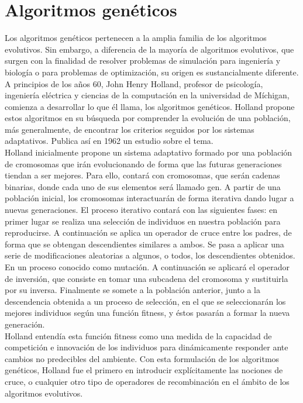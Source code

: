 \documentclass[12pt]{article} \usepackage[utf8x]{inputenc}
\begin{document}
\section{Algoritmos genéticos}

Los algoritmos genéticos pertenecen a la amplia familia de los algoritmos evolutivos. 
Sin embargo, a diferencia de la mayoría de algoritmos evolutivos, que surgen 
con la finalidad de resolver problemas de simulación para ingeniería y biología o para
problemas de optimización, su origen es sustancialmente diferente. A principios de 
los años 60, John Henry Holland, profesor de psicología, ingeniería eléctrica y ciencias
de la computación en la universidad de Míchigan, comienza a desarrollar lo que él llama,
los algoritmos genéticos. Holland propone estos algoritmos en su búsqueda por comprender
la evolución de una población, más generalmente, de encontrar los criterios seguidos
por los sistemas adaptativos. Publica así en 1962 un estudio sobre el tema.\\ 



Holland inicialmente propone un sistema adaptativo formado por una población 
de cromosomas que irán evolucionando de forma que las futuras generaciones 
tiendan a ser mejores. Para ello, contará con cromosomas, que serán cadenas 
binarias, donde cada uno de sus elementos será llamado gen. A partir de una 
población inicial, los cromosomas interactuarán de forma iterativa dando lugar 
a nuevas generaciones. El proceso iterativo contará con las siguientes fases: 
en primer lugar se realiza una selección de individuos en nuestra población 
para reproducirse. A continuación se aplica un operador de cruce entre los 
padres, de forma que se obtengan descendientes similares a ambos. Se pasa a 
aplicar una serie de modificaciones aleatorias a algunos, o todos, los descendientes 
obtenidos. En un proceso conocido como mutación. A continuación se aplicará 
el operador de inversión, que consiste en tomar una subcadena del cromosoma 
y sustituirla por su inversa. Finalmente se somete a la población anterior, 
junto a la descendencia obtenida a un proceso de selección, en el que se 
seleccionarán los mejores individuos según una función fitness, y éstos pasarán 
a formar la nueva generación.\\

Holland entendía esta función fitness como una medida de la capacidad de 
competición e innovación de los individuos para dinámicamente responder 
ante cambios no predecibles del ambiente. Con esta formulación de los 
algoritmos genéticos, Holland fue el primero en introducir explícitamente 
las nociones de cruce, o cualquier otro tipo de operadores de recombinación 
en el ámbito de los algoritmos evolutivos.\\
\end{document}
